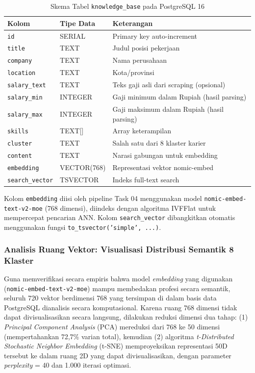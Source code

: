 \begin{table}[H]
\centering
\caption{Skema Tabel \texttt{knowledge\_base} pada PostgreSQL 16}
\label{tab:schema}
\begin{tabularx}{\textwidth}{llX}
\toprule
\textbf{Kolom} & \textbf{Tipe Data} & \textbf{Keterangan} \\
\midrule
\texttt{id} & SERIAL & Primary key auto-increment \\
\texttt{title} & TEXT & Judul posisi pekerjaan \\
\texttt{company} & TEXT & Nama perusahaan \\
\texttt{location} & TEXT & Kota/provinsi \\
\texttt{salary\_text} & TEXT & Teks gaji asli dari scraping (opsional) \\
\texttt{salary\_min} & INTEGER & Gaji minimum dalam Rupiah (hasil parsing) \\
\texttt{salary\_max} & INTEGER & Gaji maksimum dalam Rupiah (hasil parsing) \\
\texttt{skills} & TEXT[] & Array keterampilan \\
\texttt{cluster} & TEXT & Salah satu dari 8 klaster karier \\
\texttt{content} & TEXT & Narasi gabungan untuk embedding \\
\texttt{embedding} & VECTOR(768) & Representasi vektor nomic-embed \\
\texttt{search\_vector} & TSVECTOR & Indeks full-text search \\
\bottomrule
\end{tabularx}
\end{table}

Kolom \texttt{embedding} diisi oleh pipeline Task 04 menggunakan model
\texttt{nomic-embed-text-v2-moe} (768 dimensi), diindeks dengan algoritma IVFFlat
untuk mempercepat pencarian ANN. Kolom \texttt{search\_vector} dibangkitkan otomatis
menggunakan fungsi \texttt{to\_tsvector('simple', ...)}.

\subsubsection{Analisis Ruang Vektor: Visualisasi Distribusi Semantik 8 Klaster}

Guna memverifikasi secara empiris bahwa model \textit{embedding} yang digunakan (\texttt{nomic-embed-text-v2-moe}) mampu membedakan profesi secara semantik, seluruh 720 vektor berdimensi 768 yang tersimpan di dalam basis data PostgreSQL dianalisis secara komputasional. Karena ruang 768 dimensi tidak dapat divisualisasikan secara langsung, dilakukan reduksi dimensi dua tahap: (1) \textit{Principal Component Analysis} (PCA) mereduksi dari 768 ke 50 dimensi (mempertahankan 72,7\% varian total), kemudian (2) algoritma \textit{t-Distributed Stochastic Neighbor Embedding} (t-SNE) \cite{VanDerMaaten2008} memproyeksikan representasi 50D tersebut ke dalam ruang 2D yang dapat divisualisasikan, dengan parameter \textit{perplexity} = 40 dan 1.000 iterasi optimasi.

